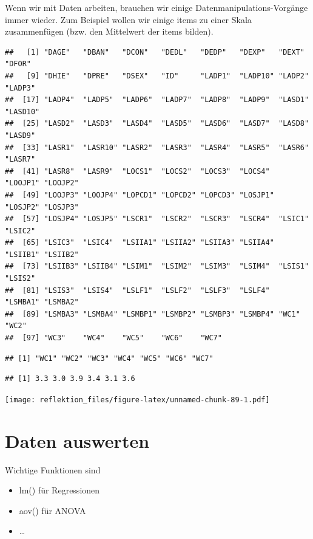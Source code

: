 \documentclass[
]{book}
\providecommand{\tightlist}{%
  \setlength{\itemsep}{0pt}\setlength{\parskip}{0pt}}
\begin{document}
Wenn wir mit Daten arbeiten, brauchen wir einige Datenmanipulations-Vorgänge immer wieder. Zum Beispiel wollen wir einige items zu einer Skala zusammenfügen (bzw. den Mittelwert der items bilden).

\begin{verbatim}
##   [1] "DAGE"   "DBAN"   "DCON"   "DEDL"   "DEDP"   "DEXP"   "DEXT"   "DFOR"  
##   [9] "DHIE"   "DPRE"   "DSEX"   "ID"     "LADP1"  "LADP10" "LADP2"  "LADP3" 
##  [17] "LADP4"  "LADP5"  "LADP6"  "LADP7"  "LADP8"  "LADP9"  "LASD1"  "LASD10"
##  [25] "LASD2"  "LASD3"  "LASD4"  "LASD5"  "LASD6"  "LASD7"  "LASD8"  "LASD9" 
##  [33] "LASR1"  "LASR10" "LASR2"  "LASR3"  "LASR4"  "LASR5"  "LASR6"  "LASR7" 
##  [41] "LASR8"  "LASR9"  "LOCS1"  "LOCS2"  "LOCS3"  "LOCS4"  "LOOJP1" "LOOJP2"
##  [49] "LOOJP3" "LOOJP4" "LOPCD1" "LOPCD2" "LOPCD3" "LOSJP1" "LOSJP2" "LOSJP3"
##  [57] "LOSJP4" "LOSJP5" "LSCR1"  "LSCR2"  "LSCR3"  "LSCR4"  "LSIC1"  "LSIC2" 
##  [65] "LSIC3"  "LSIC4"  "LSIIA1" "LSIIA2" "LSIIA3" "LSIIA4" "LSIIB1" "LSIIB2"
##  [73] "LSIIB3" "LSIIB4" "LSIM1"  "LSIM2"  "LSIM3"  "LSIM4"  "LSIS1"  "LSIS2" 
##  [81] "LSIS3"  "LSIS4"  "LSLF1"  "LSLF2"  "LSLF3"  "LSLF4"  "LSMBA1" "LSMBA2"
##  [89] "LSMBA3" "LSMBA4" "LSMBP1" "LSMBP2" "LSMBP3" "LSMBP4" "WC1"    "WC2"   
##  [97] "WC3"    "WC4"    "WC5"    "WC6"    "WC7"
\end{verbatim}

\begin{verbatim}
## [1] "WC1" "WC2" "WC3" "WC4" "WC5" "WC6" "WC7"
\end{verbatim}

\begin{verbatim}
## [1] 3.3 3.0 3.9 3.4 3.1 3.6
\end{verbatim}

\texttt{[image: reflektion\_files/figure-latex/unnamed-chunk-89-1.pdf]}

\hypertarget{daten-auswerten}{%
\section{Daten auswerten}\label{daten-auswerten}}

Wichtige Funktionen sind

\begin{itemize}
\tightlist
\item
  lm() für Regressionen
\item
  aov() für ANOVA
\item
  \ldots{}
\end{itemize}
\end{document}
